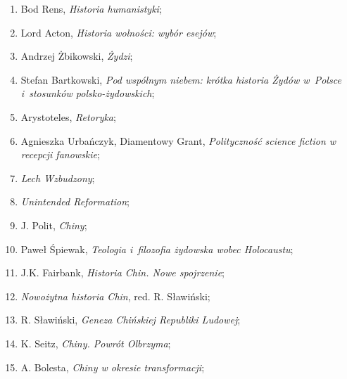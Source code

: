 \documentclass[a4paper,11pt]{article}
\begin{document}
\begin{enumerate}
\item Bod Rens, \textit{Historia humanistyki};



\item Lord Acton, \textit{Historia wolności: wybór esejów};



\item Andrzej Żbikowski, \textit{Żydzi};



\item Stefan Bartkowski, \textit{Pod wspólnym niebem: krótka historia
    Żydów w~Polsce i~stosunków polsko-żydowskich};



\item Arystoteles, \textit{Retoryka};



\item Agnieszka Urbańczyk, Diamentowy Grant, \textit{Polityczność
    science fiction w recepcji fanowskie};



\item \textit{Lech Wzbudzony};



\item \textit{Unintended Reformation};



\item J. Polit, \textit{Chiny};



\item Paweł Śpiewak, \textit{Teologia i~filozofia żydowska wobec
    Holocaustu};



\item J.K. Fairbank, \textit{Historia Chin. Nowe spojrzenie};



\item \textit{Nowożytna historia Chin}, red. R. Sławiński;



\item R. Sławiński, \textit{Geneza Chińskiej Republiki Ludowej};



\item K. Seitz, \textit{Chiny. Powrót Olbrzyma};



\item A. Bolesta, \textit{Chiny w okresie transformacji};




\end{enumerate}
\end{document}
